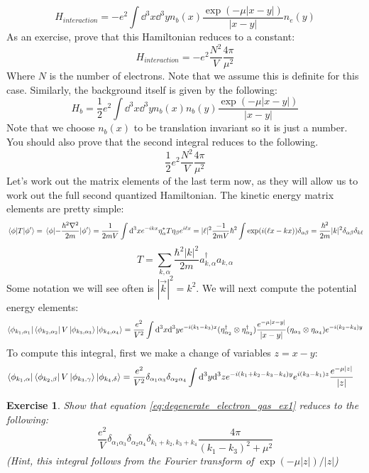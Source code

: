 \documentclass{article}
\newtheorem{exercise}{Exercise}[section]
\begin{document}
\begin{equation}
    H_{interaction} = -e^2 \int \dd^3 x \dd^3 y  n_b(x) \frac{\exp(-\mu|x-y|)}{|x-y|}n_e(y)
\end{equation}
As an exercise, prove that this Hamiltonian reduces to a constant:
\[H_{interaction} = -e^2\frac{N^2}{V}\frac{4\pi}{\mu^2}\]
Where $N$ is the number of electrons. Note that we assume this is definite for this case. Similarly, the background itself is given by the following:
\begin{equation}
H_b = \frac{1}{2}e^2\int\dd^3 x \dd^3 y n_b(x) n_b(y)\frac{\exp(-\mu|x-y|)}{|x-y|}
\end{equation}
Note that we choose $n_b(x)$ to be translation invariant so it is just a number. You should also prove that the second integral reduces to the following.
\[\frac{1}{2}e^2 \frac{N^2}{V}\frac{4\pi}{\mu^2}\]
Let's work out the matrix elements of the last term now, as they will allow us to work out the full second quantized Hamiltonian. The kinetic energy matrix elements are pretty simple:
\[\mel{\phi}{T}{\phi'}=\mel{\phi}{-\frac{\hbar^2\nabla^2}{2m}}{\phi'} = \frac{1}{2mV}\int \dd^3 x e^{-ikx}\eta_\alpha^* T \eta_\beta e^{i\ell x} = |\ell|^2\frac{-1}{2mV}\hbar^2\int \exp(i(\ell x - kx))\delta_{\alpha \beta} = \frac{\hbar^2}{2m}|k|^2\delta_{\alpha \beta}\delta_{k \ell}\]
\begin{equation}
T =\sum_{k,\alpha} \frac{\hbar^2 |k|^2}{2m}a^\dagger_{k,\alpha}a_{k,\alpha}
\end{equation}
Some notation we will see often is $|\vec{k}|^2 = k^2$. We will next compute the potential energy elements:
\[\bra{\phi_{k_1,\alpha_1}}\bra{\phi_{k_2,\alpha_2}}V\ket{\phi_{k_3,\alpha_3}}\ket{\phi_{k_4,\alpha_4}}= \frac{e^2}{V^2}\int\dd^3 x\dd^3 y e^{-i(k_1-k_3)x}(\eta_{\alpha_2}^\dagger \otimes \eta_{\alpha_2}^\dagger)\frac{e^{-\mu|x-y|}}{|x-y|}(\eta_{\alpha_3}\otimes \eta_{\alpha_4})e^{-i(k_2-k_4)y}\]
To compute this integral, first we make a change of variables $z = x-y$:
\begin{align}\bra{\phi_{k_1,\alpha}}\bra{\phi_{k_2,\beta}}V\ket{\phi_{k_3,\gamma}}\ket{\phi_{k_4,\delta}} &= \frac{e^2}{V^2}\delta_{\alpha_1 \alpha_3}\delta_{\alpha_2\alpha_4}\int \dd^3 y \dd^3 z e^{-i(k_1+k_2-k_3-k_4)y}e^{i(k_3-k_1)z}\frac{e^{-\mu|z|}}{|z|}
\label{eq:degenerate_electron_gas_ex1}
\end{align}
\begin{exercise}
Show that equation \eqref{eq:degenerate_electron_gas_ex1} reduces to the following:
\[\frac{e^2}{V}\delta_{\alpha_1 \alpha_3}\delta_{\alpha_2\alpha_4}\delta_{k_1+k_2,k_3+k_4}\frac{4\pi}{(k_1-k_3)^2+\mu^2}\]
(Hint, this integral follows from the Fourier transform of $\exp(-\mu|z|)/|z|$)
\end{exercise}
\end{document}
